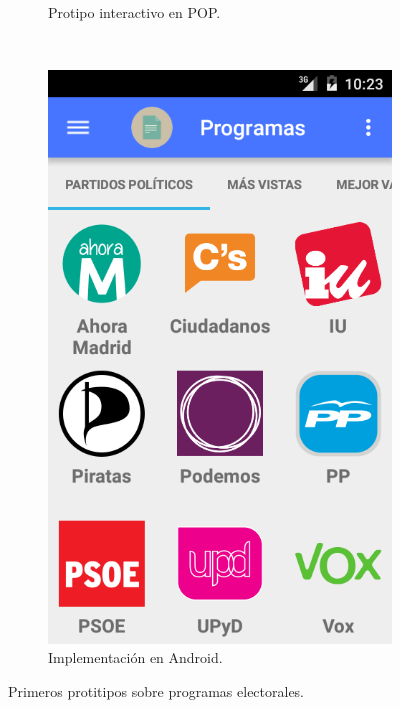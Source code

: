 \begin{enumerate}
\begin{figure}[H]
\begin{subfigure}[b]{0.3\textwidth}
                \caption{Protipo interactivo en POP.}
                \label{fig:quipText}
        \end{subfigure}
        ~
        \begin{subfigure}[b]{0.3\textwidth}
                \includegraphics[width=\textwidth]{Media/Captures/prot1_3.png}
                \caption{Implementación en Android.}
                \label{fig:quipComments}
        \end{subfigure}
        \caption{Primeros protitipos sobre programas electorales.}\label{fig:protPrograms}
	\end{figure}
	

\end{enumerate}

